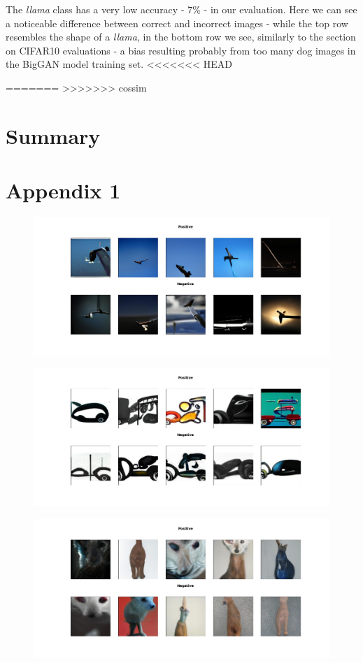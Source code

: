 \documentclass[12pt,a4paper,openany]{book}
\begin{document}
\newline
\noindent The \textit{llama} class has a very low accuracy - $7\%$ - in our evaluation. Here we can see a noticeable difference between correct and incorrect images - while the top row resembles the shape of a \textit{llama}, in the bottom row we see, similarly to the section on CIFAR10 evaluations - a bias resulting probably from too many dog images in the BigGAN model training set.
<<<<<<< HEAD

=======
>>>>>>> cossim
\chapter{Summary}
\chapter{Appendix 1}
\begin{figure}[h!]
    \centering
    \includegraphics[scale=0.4]{figs/cifar10_examples/airplane.png}
\end{figure}
\begin{figure}[h!]
    \centering
    \includegraphics[scale=0.4]{figs/cifar10_examples/automobile.png}
\end{figure}
\begin{figure}[h!]
    \centering
    \includegraphics[scale=0.4]{figs/cifar10_examples/cat.png}
\end{figure}
\end{document}
